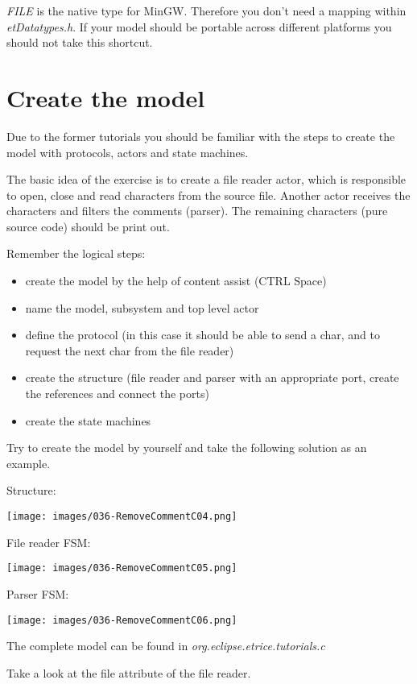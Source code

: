 \textit{FILE} is the native type for MinGW. Therefore you don't need a mapping within \textit{etDatatypes.h}. If your model should be portable across different platforms you should not take this shortcut.
 
\section{Create the model}

Due to the former tutorials you should be familiar with the steps to create the model with protocols, actors and state machines.

The basic idea of the exercise is to create a file reader actor, which is responsible to open, close and read characters from the source file. Another actor receives the characters and filters the comments (parser). The remaining characters (pure source code) should be print out. 

Remember the logical steps: 
\begin{itemize}
\item create the model by the help of content assist (CTRL Space)
\item name the model, subsystem and top level actor
\item define the protocol (in this case it should be able to send a char, and to request the next char from the file reader)
\item create the structure (file reader and parser with an appropriate port, create the references and connect the ports)
\item create the state machines
\end{itemize}

Try to create the model by yourself and take the following solution as an example.

Structure:

\texttt{[image: images/036-RemoveCommentC04.png]}

File reader FSM:

\texttt{[image: images/036-RemoveCommentC05.png]}

Parser FSM:

\texttt{[image: images/036-RemoveCommentC06.png]}

The complete model can be found in \textit{org.eclipse.etrice.tutorials.c}

Take a look at the file attribute of the file reader. 

